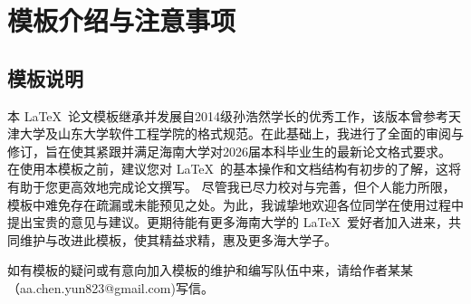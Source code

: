 
\chapter{模板介绍与注意事项}

\section{模板说明}

本 \LaTeX\ 论文模板继承并发展自2014级孙浩然学长的优秀工作，该版本曾参考天津大学及山东大学软件工程学院的格式规范。在此基础上，我进行了全面的审阅与修订，旨在使其紧跟并满足海南大学对2026届本科毕业生的最新论文格式要求。
在使用本模板之前，建议您对 \LaTeX\ 的基本操作和文档结构有初步的了解，这将有助于您更高效地完成论文撰写。
尽管我已尽力校对与完善，但个人能力所限，模板中难免存在疏漏或未能预见之处。为此，我诚挚地欢迎各位同学在使用过程中提出宝贵的意见与建议。更期待能有更多海南大学的 \LaTeX\ 爱好者加入进来，共同维护与改进此模板，使其精益求精，惠及更多海大学子。

如有模板的疑问或有意向加入模板的维护和编写队伍中来，请给作者某某（aa.chen.yun823@gmail.com)写信。

